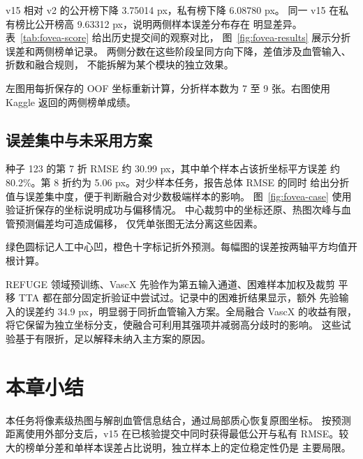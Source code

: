 v15 相对 v2 的公开榜下降 3.75014 px，私有榜下降 6.08780 px。
同一 v15 在私有榜比公开榜高 9.63312 px，说明两侧样本误差分布存在
明显差异。表~\ref{tab:fovea-score} 给出历史提交间的观察对比，
图~\ref{fig:fovea-results} 展示分折误差和两侧榜单记录。
两侧分数在这些阶段呈同方向下降，差值涉及血管输入、折数和融合规则，
不能拆解为某个模块的独立效果。

{左图用每折保存的 OOF 坐标重新计算，分折样本数为 7 至 9 张。右图使用 Kaggle 返回的两侧榜单成绩。}

\clearpage
\subsection{误差集中与未采用方案}
种子 123 的第 7 折 RMSE 约 30.99 px，其中单个样本占该折坐标平方误差
约 80.2\%。第 8 折约为 5.06 px。对少样本任务，报告总体 RMSE 的同时
给出分折值与误差集中度，便于判断融合对少数极端样本的影响。
\ifLocalReport 图~\ref{fig:fovea-case} 使用验证折保存的坐标说明成功与偏移情况。
中心裁剪中的坐标还原、热图次峰与血管预测偏差均可造成偏移，
仅凭单张图无法分离这些因素。\fi

{绿色圆标记人工中心凹，橙色十字标记折外预测。每幅图的误差按两轴平方均值开根计算。}

REFUGE 领域预训练、VascX 先验作为第五输入通道、困难样本加权及裁剪
平移 TTA 都在部分固定折验证中尝试过。记录中的困难折结果显示，额外
先验输入的误差约 34.9 px，明显弱于同折血管输入方案。全局融合 VascX
的收益有限，将它保留为独立坐标分支，使融合可利用其强项并减弱高分歧时的影响。
这些试验基于有限折，足以解释未纳入主方案的原因。

\section{本章小结}
本任务将像素级热图与解剖血管信息结合，通过局部质心恢复原图坐标。
按预测距离使用外部分支后，v15 在已核验提交中同时获得最低公开与私有
RMSE。较大的榜单分差和单样本误差占比说明，独立样本上的定位稳定性仍是
主要局限。
